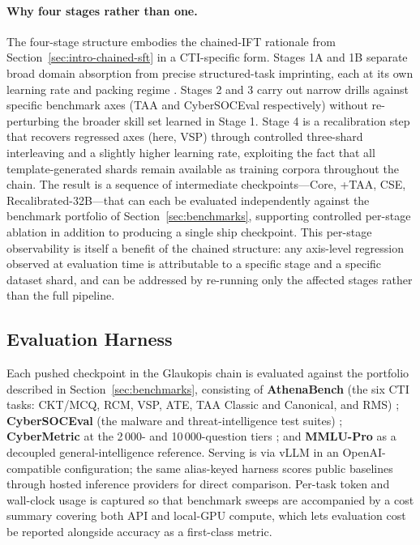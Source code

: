 \documentclass[webpdf,contemporary,large]{oup-authoring-template}
\theoremstyle{thmstyleone}
\theoremstyle{thmstyletwo}
\theoremstyle{thmstylethree}
\begin{document}
\paragraph{Why four stages rather than one.}
The four-stage structure embodies the chained-IFT rationale from Section~\ref{sec:intro-chained-sft} in a CTI-specific form. Stages 1A and 1B separate broad domain absorption from precise structured-task imprinting, each at its own learning rate and packing regime \cite{gururangan2020dontstop,chung2022flant5}. Stages 2 and 3 carry out narrow drills against specific benchmark axes (TAA and CyberSOCEval respectively) without re-perturbing the broader skill set learned in Stage 1. Stage 4 is a recalibration step that recovers regressed axes (here, VSP) through controlled three-shard interleaving and a slightly higher learning rate, exploiting the fact that all template-generated shards remain available as training corpora throughout the chain. The result is a sequence of intermediate checkpoints---Core, +TAA, CSE, Recalibrated-32B---that can each be evaluated independently against the benchmark portfolio of Section~\ref{sec:benchmarks}, supporting controlled per-stage ablation in addition to producing a single ship checkpoint. This per-stage observability is itself a benefit of the chained structure: any axis-level regression observed at evaluation time is attributable to a specific stage and a specific dataset shard, and can be addressed by re-running only the affected stages rather than the full pipeline.

\subsection{Evaluation Harness}
\label{sec:glaukopis-eval}

Each pushed checkpoint in the Glaukopis chain is evaluated against the portfolio described in Section~\ref{sec:benchmarks}, consisting of \textbf{AthenaBench} (the six CTI tasks: CKT/MCQ, RCM, VSP, ATE, TAA Classic and Canonical, and RMS) \cite{alam2025athenabench}; \textbf{CyberSOCEval} (the malware and threat-intelligence test suites) \cite{cybersoceval2025}; \textbf{CyberMetric} at the 2\,000- and 10\,000-question tiers \cite{tihanyi2024cybermetric}; and \textbf{MMLU-Pro} as a decoupled general-intelligence reference. Serving is via vLLM in an OpenAI-compatible configuration; the same alias-keyed harness scores public baselines through hosted inference providers for direct comparison. Per-task token and wall-clock usage is captured so that benchmark sweeps are accompanied by a cost summary covering both API and local-GPU compute, which lets evaluation cost be reported alongside accuracy as a first-class metric.
\end{document}
